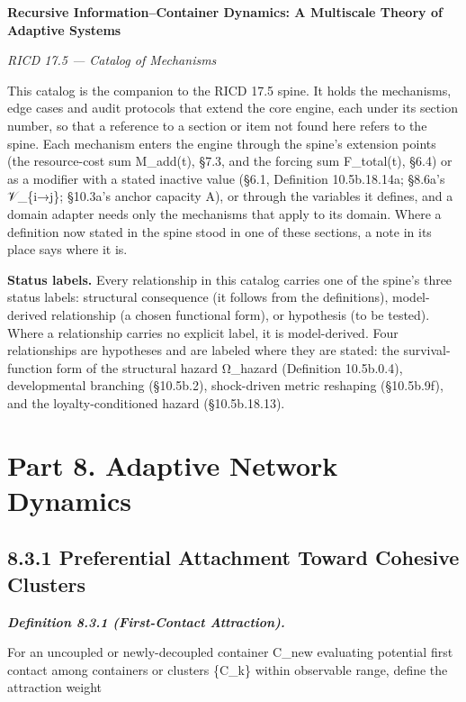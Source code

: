 \documentclass[
]{article}
\author{}
\date{}
\begin{document}
\textbf{Recursive Information--Container Dynamics: A Multiscale Theory
of Adaptive Systems}

\emph{RICD 17.5 --- Catalog of Mechanisms}

This catalog is the companion to the RICD 17.5 spine. It holds the
mechanisms, edge cases and audit protocols that extend the core engine,
each under its section number, so that a reference to a section or item
not found here refers to the spine. Each mechanism enters the engine
through the spine's extension points (the resource-cost sum M\_add(t),
§7.3, and the forcing sum F\_total(t), §6.4) or as a modifier with a
stated inactive value (§6.1, Definition 10.5b.18.14a; §8.6a's
𝒱\_\{i→j\}; §10.3a's anchor capacity A), or through the variables it
defines, and a domain adapter needs only the mechanisms that apply to
its domain. Where a definition now stated in the spine stood in one of
these sections, a note in its place says where it is.

\textbf{Status labels.} Every relationship in this catalog carries one
of the spine's three status labels: structural consequence (it follows
from the definitions), model-derived relationship (a chosen functional
form), or hypothesis (to be tested). Where a relationship carries no
explicit label, it is model-derived. Four relationships are hypotheses
and are labeled where they are stated: the survival-function form of the
structural hazard Ω\_hazard (Definition 10.5b.0.4), developmental
branching (§10.5b.2), shock-driven metric reshaping (§10.5b.9f), and the
loyalty-conditioned hazard (§10.5b.18.13).

\hypertarget{part-8.-adaptive-network-dynamics}{%
\section{Part 8. Adaptive Network
Dynamics}\label{part-8.-adaptive-network-dynamics}}

\hypertarget{preferential-attachment-toward-cohesive-clusters}{%
\subsection{8.3.1 Preferential Attachment Toward Cohesive
Clusters}\label{preferential-attachment-toward-cohesive-clusters}}

\emph{\textbf{Definition 8.3.1 (First-Contact Attraction).}}

For an uncoupled or newly-decoupled container C\_new evaluating
potential first contact among containers or clusters \{C\_k\} within
observable range, define the attraction weight
\end{document}
